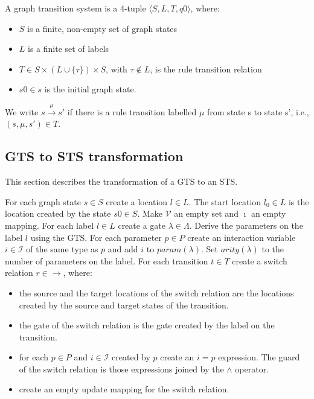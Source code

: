 \begin{definition}
A graph transition system is a 4-tuple	$\langle S, L, T, q0\rangle$, where:
\begin{itemize}
\item $S$ is a finite, non-empty set of graph states
\item $L$ is a finite set of labels
\item $T \in S \times (L \cup \{\tau\}) \times S$, with $\tau \notin L$, is the rule transition relation
\item $s0 \in s$ is the initial graph state.
\end{itemize}
We write $s \xrightarrow{\mu}s'$ if there is a rule transition labelled $\mu$ from state s to state s', i.e., $(s, \mu, s') \in T$.
\end{definition}

\subsection{GTS to STS transformation}
This section describes the transformation of a GTS to an STS.

For each graph state $s \in S$ create a location $l \in L$. The start location $l_0 \in L$ is the location created by the state $s0 \in S$. Make $\mathcal{V}$ an empty set and $\imath$ an empty mapping. For each label $l \in L$ create a gate $\lambda \in \Lambda$. Derive the parameters on the label $l$ using the GTS. For each parameter $p \in P$ create an interaction variable $i \in \mathcal{I}$ of the same type as $p$ and add $i$ to $param(\lambda)$. Set $arity(\lambda)$ to the number of parameters on the label. For each transition $t \in T$ create a switch relation $r \in \rightarrow$, where:
\begin{itemize}
  \item the source and the target locations of the switch relation are the locations created by the source and target states of the transition.
  \item the gate of the switch relation is the gate created by the label on the transition.
  \item for each $p \in P$ and $i \in \mathcal{I}$ created by $p$ create an $i = p$ expression. The guard of the switch relation is those expressions joined by the $\land$ operator.
  \item create an empty update mapping for the switch relation.
\end{itemize}

